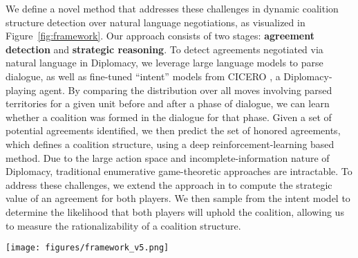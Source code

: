 We define a novel method that addresses these challenges in dynamic coalition structure detection over natural language negotiations, as visualized in Figure~\ref{fig:framework}. Our approach consists of two stages: \textbf{agreement detection} and \textbf{strategic reasoning}.
To detect agreements negotiated via natural language in Diplomacy, we leverage large language models to parse dialogue, as well as  fine-tuned ``intent'' models from CICERO \citep{CICERO}, a Diplomacy-playing agent. By comparing the distribution over all moves involving parsed territories for a given unit before and after a phase of dialogue, we can learn whether a coalition was formed in the dialogue for that phase. Given a set of potential agreements identified, we then predict the set of honored agreements, which defines a coalition structure, using a deep reinforcement-learning based method. Due to the large action space and incomplete-information nature of Diplomacy, traditional enumerative game-theoretic approaches are intractable. To address these challenges, we extend the approach in \citep{bakhtin2021no} to compute the strategic value of an agreement for both players. We then sample from the intent model to determine the likelihood that both players will uphold the coalition, allowing us to measure the rationalizability of a coalition structure.

\begin{figure*}
    \texttt{[image: figures/framework\_v5.png]}
    \caption{Proposed two-stage approach for learning coalition structures from natural language interactions in Diplomacy games. Stage 1 extracts agreements from pairwise dialogues to form an unweighted coalition structure. Stage 2 applies hypergame theory to assess the rationalizability of agreements for each player separately, which are then integrated into a weighted coalition structure representing the likelihood that an external observer believes agreements will be honored.}
    \label{fig:framework}
\end{figure*}

